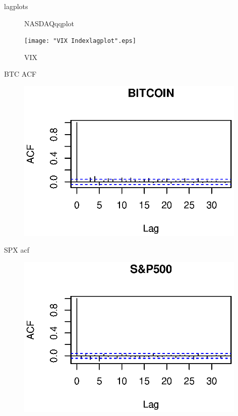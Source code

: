 \documentclass{beamer}
\begin{document}
\begin{frame}{lagplots}
\begin{figure}[h]
\begin{minipage}[b]{0.40\linewidth}
			\caption{NASDAQqqplot}
		\end{minipage}\hfill
		\begin{minipage}[b]{0.40\linewidth}
			\centering
			\texttt{[image: "VIX Indexlagplot".eps]}
			\caption{VIX}
		\end{minipage}
	\end{figure}
	
\end{frame}


\begin{frame}{BTC ACF}
	\begin{figure}[linewidth=250mm]	
		\includegraphics[width=110mm]{BTCacf.eps}
	\end{figure}
\end{frame}
\begin{frame}{SPX acf}
	\begin{figure}[b]	
		\includegraphics[width=110mm]{SPacf.eps}
	\end{figure}
\end{frame}
\end{document}
